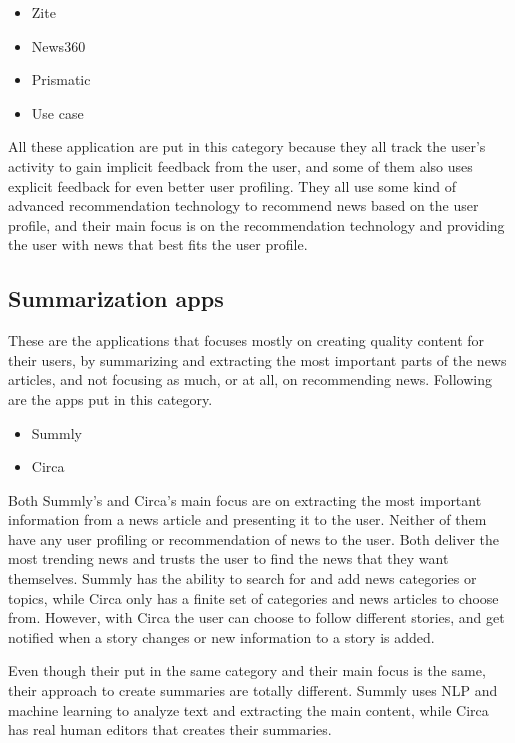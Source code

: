 \begin{itemize}
	\item Zite
	\item News360
	\item Prismatic
	\item Use case
\end{itemize}


All these application are put in this category because they all track the user's activity to gain implicit feedback from the user, and some of them also uses explicit feedback for even better user profiling. They all use some kind of advanced recommendation technology to recommend news based on the user profile, and their main focus is on the recommendation technology and providing the user with news that best fits the user profile.

\subsection{Summarization apps}
These are the applications that focuses mostly on creating quality content for their users, by summarizing and extracting the most important parts of the news articles, and not focusing as much, or at all, on recommending news. Following are the apps put in this category.

\begin{itemize}
	\item Summly
	\item Circa
\end{itemize}

Both Summly's and Circa's main focus are on extracting the most important information from a news article and presenting it to the user. Neither of them have any user profiling or recommendation of news to the user. Both deliver the most trending news and trusts the user to find the news that they want themselves. Summly has the ability to search for and add news categories or topics, while Circa only has a finite set of categories and news articles to choose from. However, with Circa the user can choose to follow different stories, and get notified when a story changes or new information to a story is added.

Even though their put in the same category and their main focus is the same, their approach to create summaries are totally different. Summly uses NLP and machine learning to analyze text and extracting the main content, while Circa has real human editors that creates their summaries.



